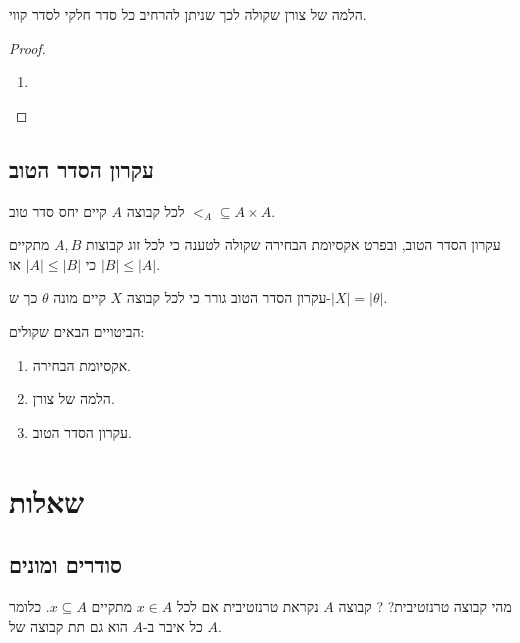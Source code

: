 \documentclass{tstextbook}
\begin{document}
\begin{proposition}
הלמה של צורן שקולה לכך שניתן להרחיב כל סדר חלקי לסדר קווי.

\end{proposition}
\begin{proof}
  \begin{enumerate}
    \item 
  \end{enumerate}
\end{proof}
\section{עקרון הסדר הטוב}

\begin{definition}
לכל קבוצה \(A\) קיים יחס סדר טוב \(<_{A}\subseteq A\times A\).

\end{definition}
\begin{proposition}
עקרון הסדר הטוב, ובפרט אקסיומת הבחירה שקולה לטענה כי לכל זוג קבוצות \(A,B\) מתקיים כי \(|A|\leq|B|\) או \(|B|\leq |A|\).

\end{proposition}
\begin{proposition}
עקרון הסדר הטוב גורר כי לכל קבוצה \(X\) קיים מונה \(\theta\) כך ש-\(|X|=|\theta|\).

\end{proposition}
\begin{theorem}[השקילות]
הביטויים הבאים שקולים:

  \begin{enumerate}
    \item אקסיומת הבחירה. 


    \item הלמה של צורן. 


    \item עקרון הסדר הטוב. 


  \end{enumerate}
\end{theorem}
\chapter{שאלות}

\section{סודרים ומונים}

מהי קבוצה טרנזטיבית?
?
קבוצה \(A\) נקראת טרנזטיבית אם לכל \(x \in A\) מתקיים \(x \subseteq A\). כלומר כל איבר ב-\(A\) הוא גם תת קבוצה של \(A\).
\end{document}
